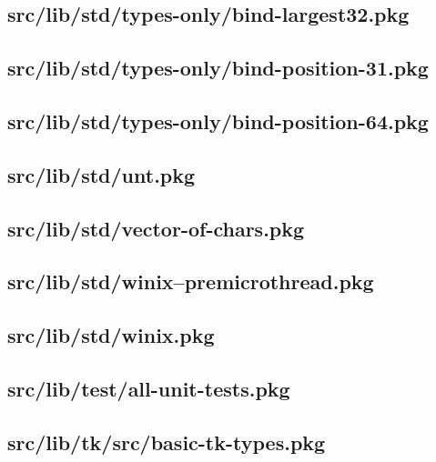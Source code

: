 \subsection{src/lib/std/types-only/bind-largest32.pkg}


\subsection{src/lib/std/types-only/bind-position-31.pkg}


\subsection{src/lib/std/types-only/bind-position-64.pkg}


\subsection{src/lib/std/unt.pkg}


\subsection{src/lib/std/vector-of-chars.pkg}


\subsection{src/lib/std/winix--premicrothread.pkg}


\subsection{src/lib/std/winix.pkg}


\subsection{src/lib/test/all-unit-tests.pkg}


\subsection{src/lib/tk/src/basic-tk-types.pkg}


